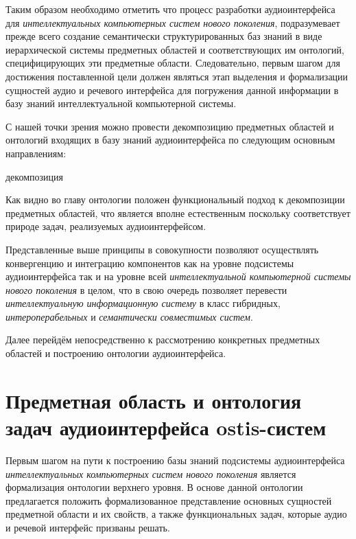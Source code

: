 Таким образом необходимо отметить что процесс разработки аудиоинтерфейса для \textit{интеллектуальных компьютерных систем нового поколения}, подразумевает прежде всего создание семантически структурированных баз знаний в виде иерархической системы предметных областей и соответствующих им онтологий, специфицирующих эти предметные области. Следовательно, первым шагом для достижения поставленной цели должен являться этап выделения и формализации сущностей аудио и речевого интерфейса для погружения данной информации в базу знаний интеллектуальной компьютерной системы.

С нашей точки зрения можно провести декомпозицию предметных областей и онтологий входящих в базу знаний аудиоинтерфейса по следующим основным направлениям:

\begin{SCn}
	\begin{scnreltoset}{декомпозиция}
	\end{scnreltoset}
\end{SCn}

Как видно во главу онтологии положен функциональный подход к декомпозиции предметных областей, что является вполне естественным поскольку соответствует природе задач, реализуемых аудиоинтерфейсом.

Представленные выше принципы в совокупности позволяют осуществлять конвергенцию и интеграцию компонентов как на уровне подсистемы аудиоинтерфейса так и на уровне всей \textit{интеллектуальной компьютерной системы нового поколения} в целом, что в свою очередь позволяет перевести \textit{интеллектуальную информационную систему} в класс гибридных, \textit{интероперабельных} и \textit{семантически совместимых систем}.
  
 Далее перейдём непосредственно к рассмотрению конкретных предметных областей и построению онтологии аудиоинтерфейса.

\section{Предметная область и онтология задач аудиоинтерфейса ostis-систем}
\label{sec_audio_interfaces_subject_area_problems}

Первым шагом на пути к построению базы знаний подсистемы аудиоинтерфейса \textit{интеллектуальных компьютерных систем нового поколения} является формализация онтологии верхнего уровня. В основе данной онтологии предлагается положить формализованное представление основных сущностей предметной области и их свойств, а также функциональных задач, которые аудио и речевой интерфейс призваны решать. 


